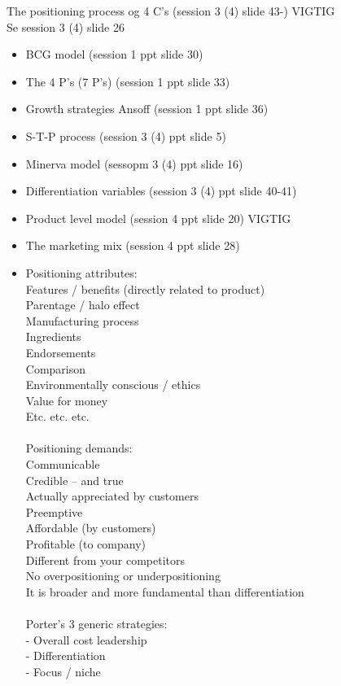 The positioning process og 4 C's (session 3 (4) slide 43-) VIGTIG
\\Se session 3 (4) slide 26

\begin{itemize}  
\item 
BCG model (session 1 ppt slide 30)
\item 
The 4 P's (7 P's) (session 1 ppt slide 33)
\item 
Growth strategies Ansoff (session 1 ppt slide 36)
\item
S-T-P process (session 3 (4) ppt slide 5)
\item
Minerva model (sessopm 3 (4) ppt slide 16)
\item
Differentiation variables (session 3 (4) ppt slide 40-41)
\item
Product level model (session 4 ppt slide 20) VIGTIG
\item
The marketing mix (session 4 ppt slide 28)
\item
Positioning attributes:
\\Features / benefits (directly related to product)
\\Parentage / halo effect
\\Manufacturing process
\\Ingredients
\\Endorsements
\\Comparison
\\Environmentally conscious / ethics
\\Value for money
\\Etc. etc. etc.
\\\\
Positioning demands:
\\Communicable
\\Credible – and true
\\Actually appreciated by customers
\\Preemptive
\\Affordable (by customers)
\\Profitable (to company)
\\Different from your competitors
\\No overpositioning or underpositioning
\\It is broader and more fundamental than differentiation
\\\\
Porter’s 3 generic strategies:
\\- Overall cost leadership
\\- Differentiation
\\- Focus / niche

\end{itemize}